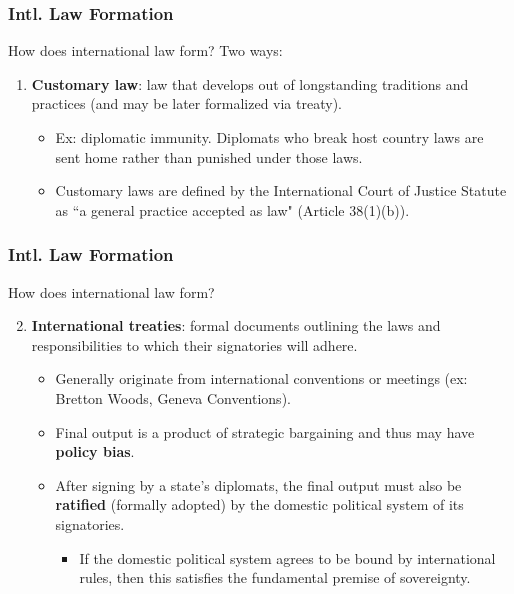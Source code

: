 \documentclass[handout]{beamer}
\begin{document}
\begin{frame} 
	\frametitle{\LARGE{Intl. Law Formation}}
How does international law form? Two ways:
	\begin{enumerate}
		\item \textbf{Customary law}: law that develops out of longstanding traditions and practices (and may be later formalized via treaty). \pause
		\begin{itemize}
			\item Ex: diplomatic immunity. Diplomats who break host country laws are sent home rather than punished under those laws. \pause
			\item Customary laws are defined by the International Court of Justice Statute as ``a general practice accepted as law" (Article 38(1)(b)).
			
			
		\end{itemize}	
	\end{enumerate}
\end{frame}

\begin{frame} 
	\frametitle{\LARGE{Intl. Law Formation}}
	How does international law form? 
	\begin{enumerate}
  	\setcounter{enumi}{1}
		\item \textbf{International treaties}: formal documents outlining the laws and responsibilities to which their signatories will adhere.
		\begin{itemize}
			\item Generally originate from international conventions or meetings (ex: Bretton Woods, Geneva Conventions). \pause
			\item Final output is a product of strategic bargaining and thus may have \textbf{policy bias}.
			\item After signing by a state's diplomats, the final output must also be \textbf{ratified} (formally adopted) by the domestic political system of its signatories. \pause
			\begin{itemize}
				\item If the domestic political system agrees to be bound by international rules, then this satisfies the fundamental premise of sovereignty.				 
			\end{itemize}
		\end{itemize}	
	\end{enumerate}
\end{frame}
\end{document}
